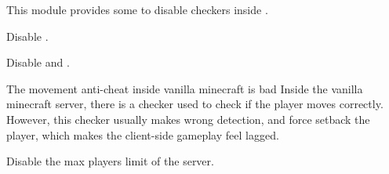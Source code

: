 This module provides some  to disable checkers inside .

Disable .

Disable  and .

\begin{warn}{The movement anti-cheat inside vanilla minecraft is bad}
    Inside the vanilla minecraft server, there is a checker used to check if the player moves correctly.
    However, this checker usually makes wrong detection, and force setback the player, which makes the client-side gameplay feel lagged.
\end{warn}

Disable the max players limit of the server.